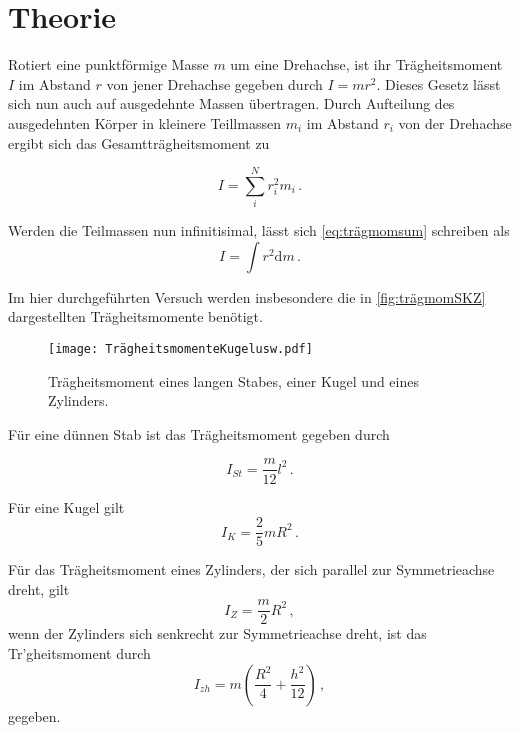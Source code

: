 \section{Theorie}
\label{sec:Theorie}
Rotiert eine punktförmige Masse $m$ um eine Drehachse, ist ihr Trägheitsmoment $I$ im Abstand $r$ von jener Drehachse gegeben durch $I = m r^2$.
Dieses Gesetz lässt sich nun auch auf ausgedehnte Massen übertragen. Durch Aufteilung des ausgedehnten Körper in kleinere Teillmassen $m_i$ im Abstand $r_i$ von der Drehachse ergibt sich
das Gesamtträgheitsmoment zu

\begin{equation}
    I = \sum_i^N r^2_i m_i\,.
    \label{eq:trägmomsum}
\end{equation}

Werden die Teilmassen nun infinitisimal, lässt sich \eqref{eq:trägmomsum} schreiben als
\begin{equation}
    I = \int r^2 \mathrm{d}m\,.
    \label{eq:trägmomint}
\end{equation}

Im hier durchgeführten Versuch werden insbesondere die in \autoref{fig:trägmomSKZ} dargestellten Trägheitsmomente benötigt.

\begin{figure}
    \centering
    \texttt{[image: TrägheitsmomenteKugelusw.pdf]}
    \caption{Trägheitsmoment eines langen Stabes, einer Kugel und eines Zylinders\cite{ap05}.}
    \label{fig:trägmomSKZ}
\end{figure}
Für eine dünnen Stab ist das Trägheitsmoment gegeben durch 

\begin{equation}
    I_{St} = \dfrac{m}{12} l^2 \,.
    \label{eq:trägdünstab}
\end{equation}

Für eine Kugel gilt
\begin{equation}
    I_{K} = \dfrac{2}{5} m R^2 \,.
    \label{eq:trägKugel}
\end{equation}

Für das Trägheitsmoment eines Zylinders, der sich parallel zur Symmetrieachse dreht, gilt
\begin{equation}
    I_{Z} = \dfrac{m}{2} R^2 \,,
    \label{eq:trägZylinderparall}
\end{equation}
wenn der Zylinders sich senkrecht zur Symmetrieachse dreht, ist das Tr'gheitsmoment durch 
\begin{equation}
    I_{zh} = m \left(\dfrac{R^2}{4} + \dfrac{h^2}{12} \right) \,,
    \label{eq:trägZylindersenkrecht}
\end{equation}
gegeben. \\


